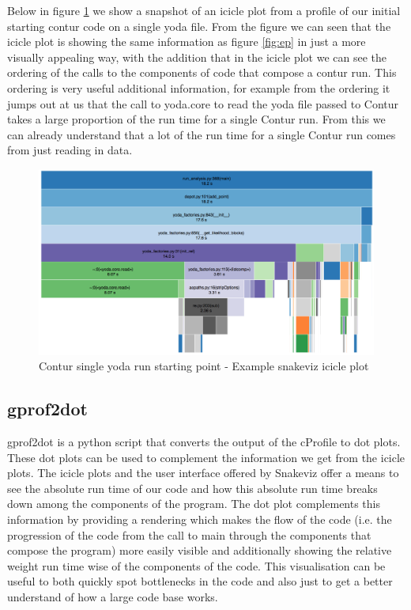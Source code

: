 Below in figure \ref{fig:single_yoda_start_profile_snakeviz} we show a snapshot of an icicle plot from a profile of our initial starting contur code on a single yoda file. From the figure we can seen that the icicle plot is showing the same information as figure \ref{fig:ep} in just a more visually appealing way, with the addition that in the icicle plot we can see the ordering of the calls to the components of code that compose a contur run. This ordering is very useful additional information, for example from the ordering it jumps out at us that the call to yoda.core to read the yoda file passed to Contur takes a large proportion of the run time for a single Contur run. From this we can already understand that a lot of the run time for a single Contur run comes from just reading in data. 

\begin{figure}[H]
\centering
\includegraphics[scale=0.3]{plots/initial_single_contur.png}
\caption{Contur single yoda run starting point - Example snakeviz icicle plot}
\label{fig:single_yoda_start_profile_snakeviz}
\end{figure}

\subsection{gprof2dot}
gprof2dot\cite{gprof2dot} is a python script that converts the output of the cProfile to dot plots. These dot plots can be used to complement the information we get from the icicle plots. The icicle plots and the user interface offered by Snakeviz offer a means to see the absolute run time of our code and how this absolute run time breaks down among the components of the program. The dot plot  complements this information by providing a rendering which makes the flow of the code (i.e. the progression of the code from the call to main through the components that compose the program) more easily visible and additionally showing the relative weight run time wise of the components of the code. This visualisation can be useful to both quickly spot bottlenecks in the code and also just to get a better understand of how a large code base works.

